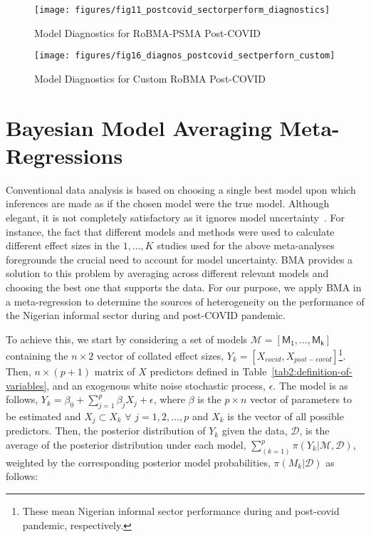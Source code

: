 \documentclass[12pt, english]{article}
\begin{document}
    \begin{figure}[H]
        \centering
        \texttt{[image: figures/fig11\_postcovid\_sectorperform\_diagnostics]}
        \caption{Model Diagnostics for RoBMA-PSMA Post-COVID}
        \label{fig12:diagnostics-robma-psma-postcovid-sectorperform}
    \end{figure}

    \begin{figure}[H]
        \centering
        \texttt{[image: figures/fig16\_diagnos\_postcovid\_sectperforn\_custom]}
        \caption{Model Diagnostics for Custom RoBMA Post-COVID}
        \label{fig13:diagnostics-custom-postcovid-sectorperform}
    \end{figure}


    \section{Bayesian Model Averaging Meta-Regressions}\label{sec4:meta-regression-methods-analyses}
    Conventional data analysis is based on choosing a single best model upon which inferences are made as if the chosen model were the true model. Although elegant, it is not completely satisfactory as it ignores model uncertainty~\parencites{madigan1995, draper1995, raftery1993, rafteryetal1993}. For instance, the fact that different models and methods were used to calculate different effect sizes in the $1, \dots, K$ studies used for the above meta-analyses foregrounds the crucial need to account for model uncertainty. BMA provides a solution to this problem by averaging across different relevant models and choosing the best one that supports the data. For our purpose, we apply BMA in a meta-regression to determine the sources of heterogeneity on the performance of the Nigerian informal sector during and post-COVID pandemic.

    To achieve this, we start by considering a set of models $\mathcal{M} = [\mathsf{M_1}, \dots, \mathsf{M_k}]$ containing the $n \times 2$ vector of collated effect sizes, $Y_k = [X_{covid}, X_{post-covid}]$\footnote{These mean Nigerian informal sector performance during and post-covid pandemic, respectively.}. Then, $n \times (p+1)$ matrix of ${X}$ predictors defined in Table~\ref{tab2:definition-of-variables}, and an exogenous white noise stochastic process, $\epsilon$. The model is as follows, $Y_k = \beta_0 + \sum_{j = 1}^{p}\beta_j X_j + \epsilon$, where $\beta$ is the $p\times n$ vector of parameters to be estimated and $\mathit{X}_j \subset \mathit{X}_k$ $\forall$ $j = 1,2, \dots, p$ and ${X_k}$ is the vector of all possible predictors. Then, the posterior distribution of $Y_k$ given the data, $\mathcal{D}$, is the average of the posterior distribution under each model, $\sum_{(k = 1)}^p \pi(Y_k | \mathcal{M}, \mathcal{D})$, weighted by the corresponding posterior model probabilities, $\pi(M_k | \mathcal{D})$ as follows:
\end{document}
